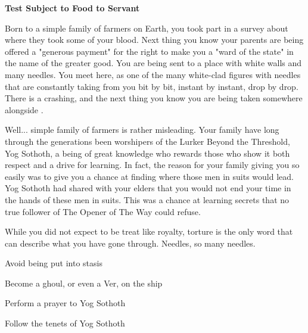 \documentclass[char]{guildcamp4}
\begin{document}
\name{\cPlead{}}

\begin{center}{\bf Test Subject to Food to Servant}\end{center}

Born to a simple family of farmers on Earth, you took part in a survey about where they took some of your blood. Next thing you know your parents are being offered a "generous payment" for the right to make you a "ward of the state" in the name of the greater good. You are being sent to a place with white walls and many needles. You meet \cSpite{}  here, as one of the many white-clad figures with needles that are constantly taking from you bit by bit, instant by instant, drop by drop. There is a crashing, and the next thing you know you are being taken somewhere alongside \cSpite{}.

Well... simple family of farmers is rather misleading. Your family have long through the generations been worshipers of the Lurker Beyond the Threshold, Yog Sothoth, a being of great knowledge who rewards those who show it both respect and a drive for learning. In fact, the reason for your family giving you so easily was to give you a chance at finding where those men in suits would lead. Yog Sothoth had shared with your elders that you would not end your time in the hands of these men in suits. This was a chance at learning secrets that no true follower of The Opener of The Way could refuse. 

While you did not expect to be treat like royalty, torture is the only word that can describe what you have gone through. Needles, so many needles.

\begin{itemz}[Goals]
	\item Avoid being put into stasis
	\item Become a ghoul, or even a Ver, on the ship
	\item Perform a prayer to Yog Sothoth
	\item Follow the tenets of Yog Sothoth
\end{itemz}

\begin{itemz}[Notes]
	\item 
\end{itemz}

\end{document}
